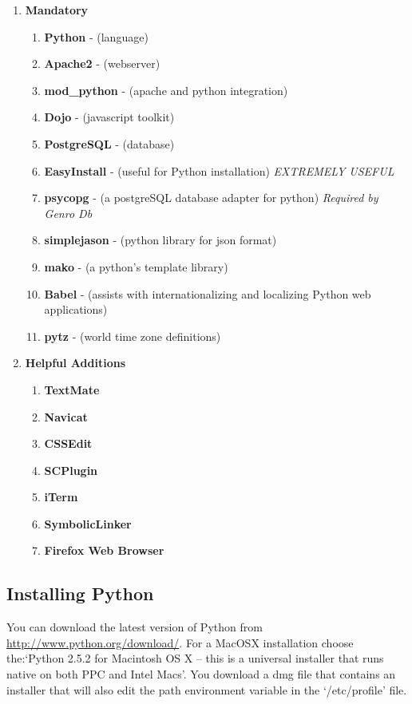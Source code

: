 \begin{enumerate}
	\item \textbf{Mandatory} 
	\begin{enumerate}
		\item \textbf{Python} - (language)
		\item \textbf{Apache2} - (webserver)
		\item \textbf{mod\_python} - (apache and python integration)
		\item \textbf{Dojo} - (javascript toolkit)
		\item \textbf{PostgreSQL} - (database)
		\item \textbf{EasyInstall} - (useful for Python installation) \emph{EXTREMELY USEFUL}
		\item \textbf{psycopg} - (a postgreSQL database adapter for python) \emph{Required by Genro Db}
		\item \textbf{simplejason} - (python library for json format)
		\item \textbf{mako} - (a python's template library)
		\item \textbf{Babel} - (assists with internationalizing and localizing Python web applications)
		\item \textbf{pytz} - (world time zone definitions)
	\end{enumerate}
	\item \textbf{Helpful Additions} 
	\begin{enumerate}
		\item \textbf{TextMate}
		\item \textbf{Navicat}
		\item \textbf{CSSEdit}
		\item \textbf{SCPlugin}
		\item \textbf{iTerm}
		\item \textbf{SymbolicLinker}
		\item \textbf{Firefox Web Browser}
	\end{enumerate}	
\end{enumerate}



\subsection{Installing Python} %
\label{sub:installing_python}
You can download the latest version of Python from \url{http://www.python.org/download/}.
For a MacOSX installation choose the:`{Python 2.5.2 for Macintosh OS X -- this is a universal installer that runs native on both PPC and Intel Macs}'.  You download a dmg file that contains an installer that will also edit the path environment variable in the `/etc/profile' file.




